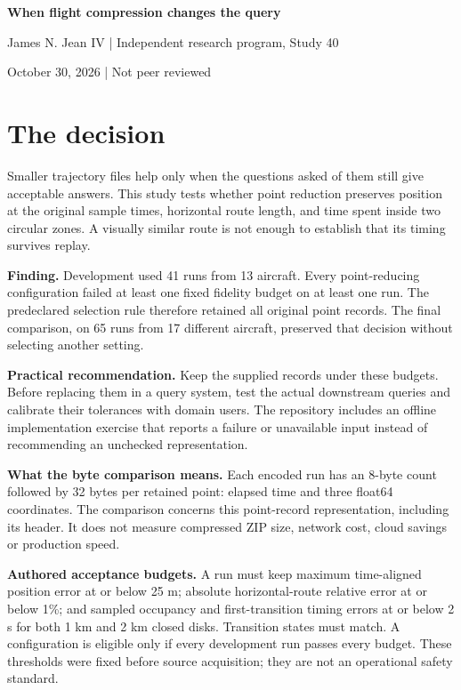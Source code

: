 \documentclass[11pt]{article}
\newcommand{\DevAircraft}{13}
\newcommand{\FinalAircraft}{17}
\newcommand{\DevRuns}{41}
\newcommand{\FinalRuns}{65}
\begin{document}
\begin{center}
{\LARGE\bfseries When flight compression changes the query}\par
\vspace{5pt}{\large An audit of point reduction, route length and zone timing}\par
James N. Jean IV \quad | \quad Independent research program, Study 40\par
October 30, 2026 \quad | \quad Not peer reviewed
\end{center}
\section*{The decision}
Smaller trajectory files help only when the questions asked of them still give acceptable answers. This study tests whether point reduction preserves position at the original sample times, horizontal route length, and time spent inside two circular zones. A visually similar route is not enough to establish that its timing survives replay.

\textbf{Finding.} Development used \DevRuns{} runs from \DevAircraft{} aircraft. Every point-reducing configuration failed at least one fixed fidelity budget on at least one run. The predeclared selection rule therefore retained all original point records. The final comparison, on \FinalRuns{} runs from \FinalAircraft{} different aircraft, preserved that decision without selecting another setting.

\textbf{Practical recommendation.} Keep the supplied records under these budgets. Before replacing them in a query system, test the actual downstream queries and calibrate their tolerances with domain users. The repository includes an offline implementation exercise that reports a failure or unavailable input instead of recommending an unchecked representation.

\textbf{What the byte comparison means.} Each encoded run has an 8-byte count followed by 32 bytes per retained point: elapsed time and three float64 coordinates. The comparison concerns this point-record representation, including its header. It does not measure compressed ZIP size, network cost, cloud savings or production speed.

\textbf{Authored acceptance budgets.} A run must keep maximum time-aligned position error at or below 25 m; absolute horizontal-route relative error at or below 1\%; and sampled occupancy and first-transition timing errors at or below 2 s for both 1 km and 2 km closed disks. Transition states must match. A configuration is eligible only if every development run passes every budget. These thresholds were fixed before source acquisition; they are not an operational safety standard.
\end{document}

